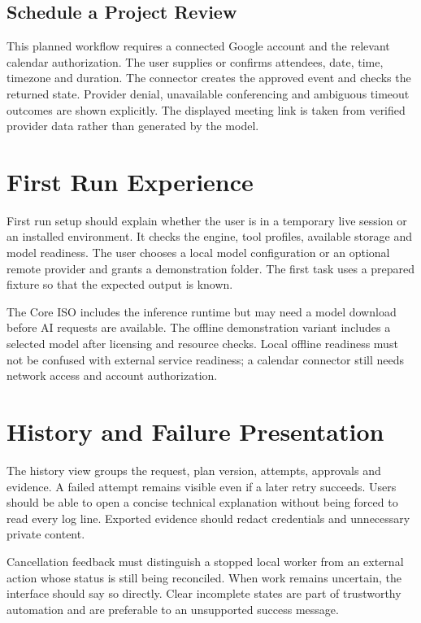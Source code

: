 \subsection{Schedule a Project Review}
This planned workflow requires a connected Google account and the relevant calendar authorization. The user supplies or confirms attendees, date, time, timezone and duration. The connector creates the approved event and checks the returned state. Provider denial, unavailable conferencing and ambiguous timeout outcomes are shown explicitly. The displayed meeting link is taken from verified provider data rather than generated by the model.

\section{First Run Experience}
First run setup should explain whether the user is in a temporary live session or an installed environment. It checks the engine, tool profiles, available storage and model readiness. The user chooses a local model configuration or an optional remote provider and grants a demonstration folder. The first task uses a prepared fixture so that the expected output is known.

The Core ISO includes the inference runtime but may need a model download before AI requests are available. The offline demonstration variant includes a selected model after licensing and resource checks. Local offline readiness must not be confused with external service readiness; a calendar connector still needs network access and account authorization.

\section{History and Failure Presentation}
The history view groups the request, plan version, attempts, approvals and evidence. A failed attempt remains visible even if a later retry succeeds. Users should be able to open a concise technical explanation without being forced to read every log line. Exported evidence should redact credentials and unnecessary private content.

Cancellation feedback must distinguish a stopped local worker from an external action whose status is still being reconciled. When work remains uncertain, the interface should say so directly. Clear incomplete states are part of trustworthy automation and are preferable to an unsupported success message.
